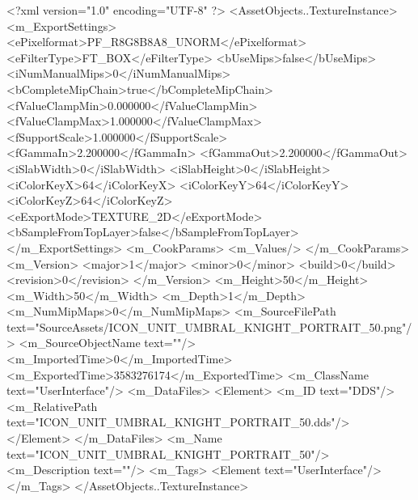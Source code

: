 <?xml version="1.0" encoding="UTF-8" ?>
<AssetObjects..TextureInstance>
	<m_ExportSettings>
		<ePixelformat>PF_R8G8B8A8_UNORM</ePixelformat>
		<eFilterType>FT_BOX</eFilterType>
		<bUseMips>false</bUseMips>
		<iNumManualMips>0</iNumManualMips>
		<bCompleteMipChain>true</bCompleteMipChain>
		<fValueClampMin>0.000000</fValueClampMin>
		<fValueClampMax>1.000000</fValueClampMax>
		<fSupportScale>1.000000</fSupportScale>
		<fGammaIn>2.200000</fGammaIn>
		<fGammaOut>2.200000</fGammaOut>
		<iSlabWidth>0</iSlabWidth>
		<iSlabHeight>0</iSlabHeight>
		<iColorKeyX>64</iColorKeyX>
		<iColorKeyY>64</iColorKeyY>
		<iColorKeyZ>64</iColorKeyZ>
		<eExportMode>TEXTURE_2D</eExportMode>
		<bSampleFromTopLayer>false</bSampleFromTopLayer>
	</m_ExportSettings>
	<m_CookParams>
		<m_Values/>
	</m_CookParams>
	<m_Version>
		<major>1</major>
		<minor>0</minor>
		<build>0</build>
		<revision>0</revision>
	</m_Version>
	<m_Height>50</m_Height>
	<m_Width>50</m_Width>
	<m_Depth>1</m_Depth>
	<m_NumMipMaps>0</m_NumMipMaps>
	<m_SourceFilePath text="SourceAssets/ICON_UNIT_UMBRAL_KNIGHT_PORTRAIT_50.png"/>
	<m_SourceObjectName text=""/>
	<m_ImportedTime>0</m_ImportedTime>
	<m_ExportedTime>3583276174</m_ExportedTime>
	<m_ClassName text="UserInterface"/>
	<m_DataFiles>
		<Element>
			<m_ID text="DDS"/>
			<m_RelativePath text="ICON_UNIT_UMBRAL_KNIGHT_PORTRAIT_50.dds"/>
		</Element>
	</m_DataFiles>
	<m_Name text="ICON_UNIT_UMBRAL_KNIGHT_PORTRAIT_50"/>
	<m_Description text=""/>
	<m_Tags>
		<Element text="UserInterface"/>
	</m_Tags>
</AssetObjects..TextureInstance>

